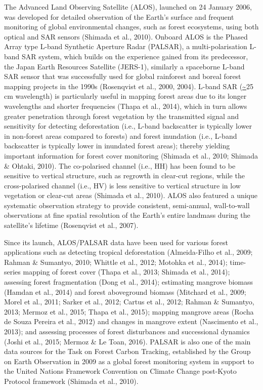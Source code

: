 The Advanced Land Observing Satellite (ALOS), launched on 24 January 2006, was developed for detailed observation of the Earth’s surface and frequent monitoring of global environmental changes, such as forest ecosystems, using both optical and SAR sensors (Shimada et al., 2010). Onboard ALOS is the Phased Array type L-band Synthetic Aperture Radar (PALSAR), a multi-polarisation L-band SAR system, which builds on the experience gained from its predecessor, the Japan Earth Resources Satellite (JERS-1), similarly a spaceborne L-band SAR sensor that was successfully used for global rainforest and boreal forest mapping projects in the 1990s (Rosenqvist et al., 2000, 2004). L-band SAR (\url{~}25 cm wavelength) is particularly useful in mapping forest areas due to its longer wavelengths and shorter frequencies (Thapa et al., 2014), which in turn allows greater penetration through forest vegetation by the transmitted signal and sensitivity for detecting deforestation (i.e., L-band backscatter is typically lower in non-forest areas compared to forests) and forest inundation (i.e., L-band backscatter is typically lower in inundated forest areas); thereby yielding important information for forest cover monitoring (Shimada et al., 2010; Shimada \& Ohtaki, 2010). The co-polarised channel (i.e., HH) has been found to be sensitive to vertical structure, such as regrowth in clear-cut regions, while the cross-polarised channel (i.e., HV) is less sensitive to vertical structure in low vegetation or clear-cut areas (Shimada et al., 2010). ALOS also featured a unique systematic observation strategy to provide consistent, semi-annual, wall-to-wall observations at fine spatial resolution of the Earth's entire landmass during the satellite's lifetime (Rosenqvist et al., 2007).

Since its launch, ALOS/PALSAR data have been used for various forest applications such as detecting tropical deforestation (Almeida-Filho et al., 2009; Rahman \& Sumantyo, 2010; Whittle et al., 2012; Motohka et al., 2014); time-series mapping of forest cover (Thapa et al., 2013; Shimada et al., 2014); assessing forest fragmentation (Dong et al., 2014); estimating mangrove biomass (Hamdan et al., 2014) and forest aboveground biomass (Mitchard et al., 2009; Morel et al., 2011; Sarker et al., 2012; Cartus et al., 2012; Rahman \& Sumantyo, 2013; Mermoz et al., 2015; Thapa et al., 2015); mapping mangrove areas (Rocha de Souza Pereira et al., 2012) and changes in mangrove extent (Nascimento et al., 2013); and assessing processes of forest disturbances and successional dynamics (Joshi et al., 2015; Mermoz \& Le Toan, 2016). PALSAR is also one of the main data sources for the Task on Forest Carbon Tracking, established by the Group on Earth Observation in 2009 as a global forest monitoring system in support to the United Nations Framework Convention on Climate Change post-Kyoto Protocol framework (Shimada et al., 2010).

